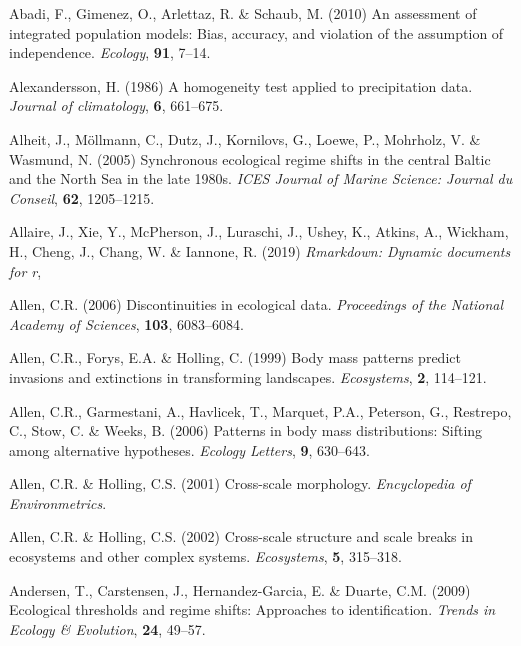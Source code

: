 \documentclass[print]{nuthesis}
\begin{document}
\setlength{\parindent}{-0.20in}
\setlength{\leftskip}{0.20in}
\setlength{\parskip}{8pt}

\hypertarget{refs}{}
\leavevmode\hypertarget{ref-abadi2010assessment}{}%
Abadi, F., Gimenez, O., Arlettaz, R. \& Schaub, M. (2010) An assessment of integrated population models: Bias, accuracy, and violation of the assumption of independence. \emph{Ecology}, \textbf{91}, 7--14.

\leavevmode\hypertarget{ref-alexandersson1986homogeneity}{}%
Alexandersson, H. (1986) A homogeneity test applied to precipitation data. \emph{Journal of climatology}, \textbf{6}, 661--675.

\leavevmode\hypertarget{ref-alheit_synchronous_2005}{}%
Alheit, J., Möllmann, C., Dutz, J., Kornilovs, G., Loewe, P., Mohrholz, V. \& Wasmund, N. (2005) Synchronous ecological regime shifts in the central Baltic and the North Sea in the late 1980s. \emph{ICES Journal of Marine Science: Journal du Conseil}, \textbf{62}, 1205--1215.

\leavevmode\hypertarget{ref-rmarkdown}{}%
Allaire, J., Xie, Y., McPherson, J., Luraschi, J., Ushey, K., Atkins, A., Wickham, H., Cheng, J., Chang, W. \& Iannone, R. (2019) \emph{Rmarkdown: Dynamic documents for r},

\leavevmode\hypertarget{ref-allen2006discontinuities}{}%
Allen, C.R. (2006) Discontinuities in ecological data. \emph{Proceedings of the National Academy of Sciences}, \textbf{103}, 6083--6084.

\leavevmode\hypertarget{ref-allen1999body}{}%
Allen, C.R., Forys, E.A. \& Holling, C. (1999) Body mass patterns predict invasions and extinctions in transforming landscapes. \emph{Ecosystems}, \textbf{2}, 114--121.

\leavevmode\hypertarget{ref-allen2006patterns}{}%
Allen, C.R., Garmestani, A., Havlicek, T., Marquet, P.A., Peterson, G., Restrepo, C., Stow, C. \& Weeks, B. (2006) Patterns in body mass distributions: Sifting among alternative hypotheses. \emph{Ecology Letters}, \textbf{9}, 630--643.

\leavevmode\hypertarget{ref-allen2001cross}{}%
Allen, C.R. \& Holling, C.S. (2001) Cross-scale morphology. \emph{Encyclopedia of Environmetrics}.

\leavevmode\hypertarget{ref-allen2002cross}{}%
Allen, C.R. \& Holling, C.S. (2002) Cross-scale structure and scale breaks in ecosystems and other complex systems. \emph{Ecosystems}, \textbf{5}, 315--318.

\leavevmode\hypertarget{ref-andersen_ecological_2009}{}%
Andersen, T., Carstensen, J., Hernandez-Garcia, E. \& Duarte, C.M. (2009) Ecological thresholds and regime shifts: Approaches to identification. \emph{Trends in Ecology \& Evolution}, \textbf{24}, 49--57.
\end{document}
